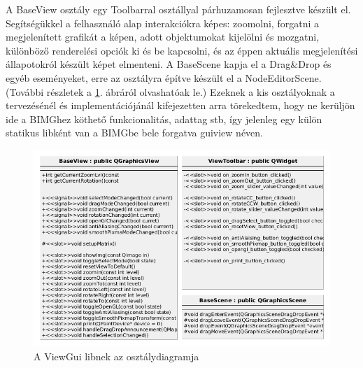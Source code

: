 \documentclass[a4paper,12pt,oneside]{report}
\begin{document}
A BaseView osztály egy Toolbarral osztállyal párhuzamosan fejlesztve készült el. Segítségükkel a felhasználó alap interakciókra képes: zoomolni, forgatni a megjelenített grafikát a képen, adott objektumokat kijelölni és mozgatni, különböző renderelési opciók ki és be kapcsolni, és az éppen aktuális megjelenítési állapotokról készült képet elmenteni. A BaseScene kapja el a Drag\&Drop és egyéb eseményeket, erre az osztályra építve készült el a NodeEditorScene. (További részletek a \ref{fig:bimg_viewgui}. ábráról olvashatóak le.)
Ezeknek a kis osztályoknak a tervezésénél és implementációjánál kifejezetten arra törekedtem, hogy ne kerüljön ide a BIMGhez köthető funkcionalitás, adattag stb, így jelenleg egy külön statikus libként van a BIMGbe bele forgatva guiview néven.
\begin{center}
\begin{figure}[h]
  \includegraphics[width=1\textwidth]{viewgui_dia.png}
  \caption{A ViewGui libnek az osztálydiagramja}

  \label{fig:bimg_viewgui}
\end{figure}
\end{center}
\end{document}
